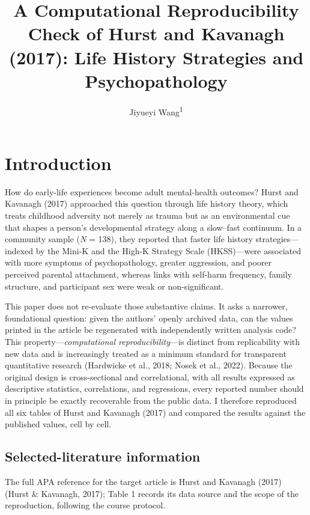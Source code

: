 \documentclass[
  english,
  man,floatsintext]{apa6}
\title{A Computational Reproducibility Check of Hurst and Kavanagh (2017): Life History Strategies and Psychopathology}
\author{Jiyueyi Wang\textsuperscript{1}}
\date{}
\affiliation{\vspace{0.5cm}\textsuperscript{1} School of Psychology, Nanjing Normal University}
\begin{document}
\maketitle

\section{Introduction}\label{introduction}

How do early-life experiences become adult mental-health outcomes? Hurst and Kavanagh (2017) approached this question through life history theory, which treats childhood adversity not merely as trauma but as an environmental cue that shapes a person's developmental strategy along a slow--fast continuum. In a community sample (\emph{N} = 138), they reported that faster life history strategies---indexed by the Mini-K and the High-K Strategy Scale (HKSS)---were associated with more symptoms of psychopathology, greater aggression, and poorer perceived parental attachment, whereas links with self-harm frequency, family structure, and participant sex were weak or non-significant.

This paper does not re-evaluate those substantive claims. It asks a narrower, foundational question: given the authors' openly archived data, can the values printed in the article be regenerated with independently written analysis code? This property---\emph{computational reproducibility}---is distinct from replicability with new data and is increasingly treated as a minimum standard for transparent quantitative research (Hardwicke et al., 2018; Nosek et al., 2022). Because the original design is cross-sectional and correlational, with all results expressed as descriptive statistics, correlations, and regressions, every reported number should in principle be exactly recoverable from the public data. I therefore reproduced all six tables of Hurst and Kavanagh (2017) and compared the results against the published values, cell by cell.

\subsection{Selected-literature information}\label{selected-literature-information}

The full APA reference for the target article is Hurst and Kavanagh (2017) (Hurst \& Kavanagh, 2017); Table 1 records its data source and the scope of the reproduction, following the course protocol.
\end{document}
